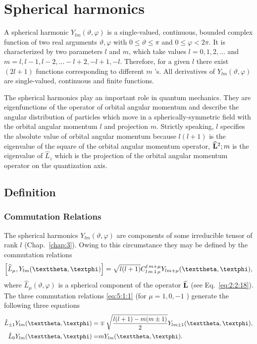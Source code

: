 \chapter{Spherical harmonics}\label{chap:5}
A spherical harmonic $Y_{l m}(\vartheta, \varphi)$ is a single-valued, continuous, bounded complex function of two real arguments $\vartheta, \varphi$ with $0 \leq \vartheta \leq \pi$ and $0 \leq \varphi<2 \pi$. It is characterized by two parameters $l$ and $m$, which take values $l=0,1,2, \ldots$ and $m=l, l-1, l-2, \ldots-l+2,-l+1,-l$. Therefore, for a given $l$ there exist $(2 l+1)$ functions corresponding to different $m$ 's. All derivatives of $Y_{l m}(\vartheta, \varphi)$ are single-valued, continuous and finite functions.

The spherical harmonics play an important role in quantum mechanics. They are eigenfunctions of the operator of orbital angular momentum and describe the angular distribution of particles which move in a spherically-symmetric field with the orbital angular momentum $l$ and projection $m$. Strictly speaking, $l$ specifies the absolute value of orbital angular momentum because $l(l+1)$ is the eigenvalue of the square of the orbital angular momentum operator, $\widehat{\mathbf{L}}^{2} ; m$ is the eigenvalue of $\widehat{L}_{z}$ which is the projection of the orbital angular momentum operator on the quantization axis.

\section{Definition}\label{sec:5.1}
\subsection{Commutation Relations}\label{sec:5.1.1}
The spherical harmonics $Y_{l m}(\vartheta, \varphi)$ are components of some irreducible tensor of rank $l$ (Chap.~\ref{chap:3}). Owing to this circumstance they may be defined by the commutation relations
\begin{equation}
\left[\widehat{L}_{\mu}, Y_{l m}(\vartheta, \varphi)\right]=\sqrt{l(l+1)} \clebsch{l}{m}{1}{\mu}{l}{m+\mu} Y_{l m+\mu}(\vartheta, \varphi), \label{eq:5:1:1}
\end{equation}
where $\widehat{L}_{\mu}(\vartheta, \varphi)$ is a spherical component of the operator $\widehat{\mathbf{L}}$ (see Eq.~\eqref{eq:2:2:18}).\\
The three commutation relations \eqref{eq:5:1:1} (for $\mu=1,0,-1$ ) generate the following three equations
\begin{align}
\hat{L}_{ \pm 1} Y_{l m}(\vartheta, \varphi)=&\mp \sqrt{\frac{l(l+1)-m(m \pm 1)}{2}} Y_{l m \pm 1}(\vartheta, \varphi) , \label{eq:5:1:2}\\
\hat{L}_{0} Y_{l m}(\vartheta, \varphi)=&m Y_{l m}(\vartheta, \varphi). \notag
\end{align}
